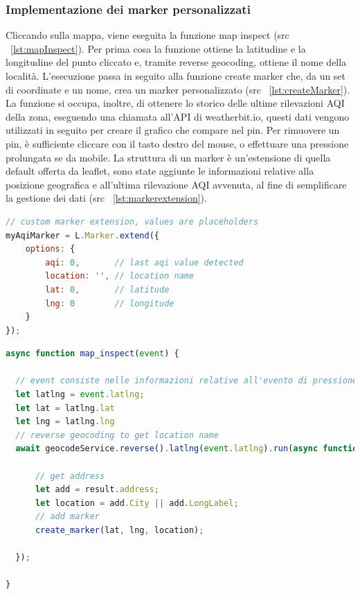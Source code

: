 \subsubsection{Implementazione dei marker personalizzati}
Cliccando sulla mappa, viene eseguita la funzione map inspect (src ~\ref{lst:mapInspect}).
Per prima cosa la funzione ottiene la latitudine e la longitudine del punto cliccato e, tramite reverse geocoding, ottiene il nome della località.
L'esecuzione passa in seguito alla funzione create marker che, da un set di coordinate e un nome, crea un marker personalizzato (src ~\ref{lst:createMarker}).
La funzione si occupa, inoltre, di ottenere lo storico delle ultime rilevazioni AQI della zona, eseguendo una chiamata all'API di weatherbit.io, questi dati
vengono utilizzati in seguito per creare il grafico che compare nel pin.
Per rimuovere un pin, è sufficiente cliccare con il tasto destro del mouse, o effettuare una pressione prolungata se da mobile.
La struttura di un marker è un'estensione di quella default offerta da leaflet, sono state aggiunte le informazioni relative alla posizione geografica e all'ultima rilevazione AQI avvenuta, al fine di semplificare la gestione dei dati (src ~\ref{lst:markerextension}).
\label{lst:markerextension}
\begin{lstlisting}[language=Javascript]
// custom marker extension, values are placeholders
myAqiMarker = L.Marker.extend({
    options: {
        aqi: 0,       // last aqi value detected
        location: '', // location name
        lat: 0,       // latitude
        lng: 0        // longitude
    }
});
\end{lstlisting}

\label{lst:mapInspect}
\begin{lstlisting}[language=Javascript]
async function map_inspect(event) {

  // event consiste nelle informazioni relative all'evento di pressione sulla mappa
  let latlng = event.latlng;
  let lat = latlng.lat
  let lng = latlng.lng
  // reverse geocoding to get location name
  await geocodeService.reverse().latlng(event.latlng).run(async function (error, result) {

      // get address
      let add = result.address;
      let location = add.City || add.LongLabel;
      // add marker
      create_marker(lat, lng, location);

  });

}
\end{lstlisting}


